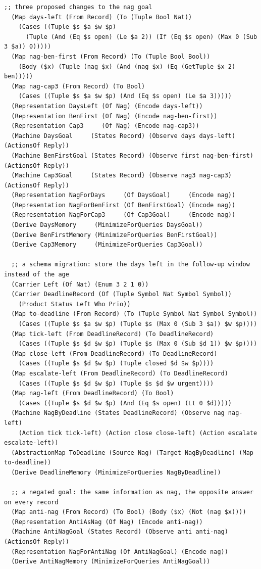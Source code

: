 \documentclass[11pt]{article}
\theoremstyle{definition}
\theoremstyle{plain}
\begin{document}
\begin{lstlisting}[style=mettamod]
  ;; three proposed changes to the nag goal
  (Map days-left (From Record) (To (Tuple Bool Nat))
    (Cases ((Tuple $s $a $w $p)
      (Tuple (And (Eq $s open) (Le $a 2)) (If (Eq $s open) (Max 0 (Sub 3 $a)) 0)))))
  (Map nag-ben-first (From Record) (To (Tuple Bool Bool))
    (Body ($x) (Tuple (nag $x) (And (nag $x) (Eq (GetTuple $x 2) ben)))))
  (Map nag-cap3 (From Record) (To Bool)
    (Cases ((Tuple $s $a $w $p) (And (Eq $s open) (Le $a 3)))))
  (Representation DaysLeft (Of Nag) (Encode days-left))
  (Representation BenFirst (Of Nag) (Encode nag-ben-first))
  (Representation Cap3     (Of Nag) (Encode nag-cap3))
  (Machine DaysGoal     (States Record) (Observe days days-left)       (ActionsOf Reply))
  (Machine BenFirstGoal (States Record) (Observe first nag-ben-first)  (ActionsOf Reply))
  (Machine Cap3Goal     (States Record) (Observe nag3 nag-cap3)        (ActionsOf Reply))
  (Representation NagForDays     (Of DaysGoal)     (Encode nag))
  (Representation NagForBenFirst (Of BenFirstGoal) (Encode nag))
  (Representation NagForCap3     (Of Cap3Goal)     (Encode nag))
  (Derive DaysMemory     (MinimizeForQueries DaysGoal))
  (Derive BenFirstMemory (MinimizeForQueries BenFirstGoal))
  (Derive Cap3Memory     (MinimizeForQueries Cap3Goal))

  ;; a schema migration: store the days left in the follow-up window instead of the age
  (Carrier Left (Of Nat) (Enum 3 2 1 0))
  (Carrier DeadlineRecord (Of (Tuple Symbol Nat Symbol Symbol))
    (Product Status Left Who Prio))
  (Map to-deadline (From Record) (To (Tuple Symbol Nat Symbol Symbol))
    (Cases ((Tuple $s $a $w $p) (Tuple $s (Max 0 (Sub 3 $a)) $w $p))))
  (Map tick-left (From DeadlineRecord) (To DeadlineRecord)
    (Cases ((Tuple $s $d $w $p) (Tuple $s (Max 0 (Sub $d 1)) $w $p))))
  (Map close-left (From DeadlineRecord) (To DeadlineRecord)
    (Cases ((Tuple $s $d $w $p) (Tuple closed $d $w $p))))
  (Map escalate-left (From DeadlineRecord) (To DeadlineRecord)
    (Cases ((Tuple $s $d $w $p) (Tuple $s $d $w urgent))))
  (Map nag-left (From DeadlineRecord) (To Bool)
    (Cases ((Tuple $s $d $w $p) (And (Eq $s open) (Lt 0 $d)))))
  (Machine NagByDeadline (States DeadlineRecord) (Observe nag nag-left)
    (Action tick tick-left) (Action close close-left) (Action escalate escalate-left))
  (AbstractionMap ToDeadline (Source Nag) (Target NagByDeadline) (Map to-deadline))
  (Derive DeadlineMemory (MinimizeForQueries NagByDeadline))

  ;; a negated goal: the same information as nag, the opposite answer on every record
  (Map anti-nag (From Record) (To Bool) (Body ($x) (Not (nag $x))))
  (Representation AntiAsNag (Of Nag) (Encode anti-nag))
  (Machine AntiNagGoal (States Record) (Observe anti anti-nag) (ActionsOf Reply))
  (Representation NagForAntiNag (Of AntiNagGoal) (Encode nag))
  (Derive AntiNagMemory (MinimizeForQueries AntiNagGoal))


\end{lstlisting}
\end{document}
